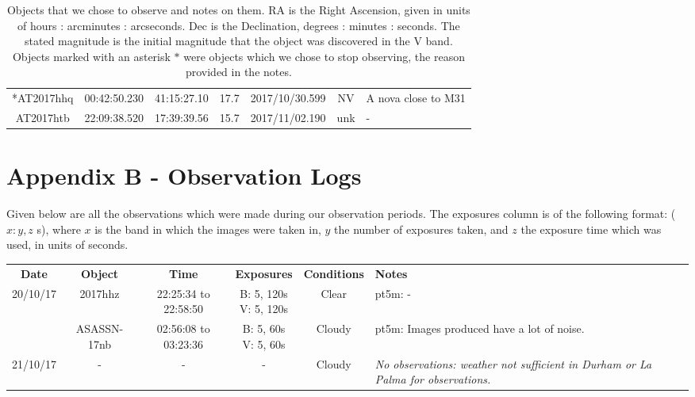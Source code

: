 \documentclass[twocolumn]{revtex4}
\begin{document}
{\begin{table}[h!]
\begin{tabularx}{\textwidth}{c c c c @{\hskip 5pt} c c X}
    *AT2017hhq & 00:42:50.230 & 41:15:27.10 & 17.7 & 2017/10/30.599 & NV & {A nova close to M31}  \\
    AT2017htb & 22:09:38.520 & 17:39:39.56 & 15.7 & 2017/11/02.190 & unk & {-}  \\
    \hline      
\end{tabularx}
\caption{Objects that we chose to observe and notes on them. RA is the Right Ascension, given in units of hours : arcminutes : arcseconds. Dec is the Declination, degrees : minutes : seconds. The stated magnitude is the initial magnitude that the object was discovered in the V band. Objects marked with an asterisk $*$ were objects which we chose to stop observing, the reason provided in the notes.}
\label{objects}
\end{table}


\clearpage

\onecolumngrid
\vspace{-3ex}
\section*{Appendix B - Observation Logs} \label{obslogs}
\vspace{-2ex}
Given below are all the observations which were made during our observation periods. The exposures column is of the following format: ($x: y, z$ s), where $x$ is the band in which the images were taken in, $y$ the number of exposures taken, and $z$ the exposure time which was used, in units of seconds.
{\renewcommand{\arraystretch}{1.2}%
\begin{table}[h!]
\centering    
\begin{tabularx}{\textwidth}{c@{\hskip 5pt} c c@{\hskip 5pt} c@{\hskip 5pt} c@{\hskip 5pt} X}
    \hline
    \textbf{Date} & \textbf{Object} & \textbf{Time} & \textbf{Exposures} & \textbf{  Conditions  } & \textbf{Notes} \\ 
    20/10/17 & 2017hhz & 22:25:34 to 22:58:50 & \makecell{B: 5, 120s \\ V: 5, 120s} & {Clear} & {pt5m: -}  \\
    	& ASASSN-17nb &  02:56:08 to 03:23:36 & \makecell{B: 5, 60s \\ V: 5, 60s} & {Cloudy} & {pt5m: Images produced have a lot of noise.} \\      
	
    21/10/17 & - & - & - & Cloudy & {\em No observations: weather not sufficient in Durham or La Palma for observations. \em} \\
    

\end{tabularx}
\end{table}}}
\end{document}
